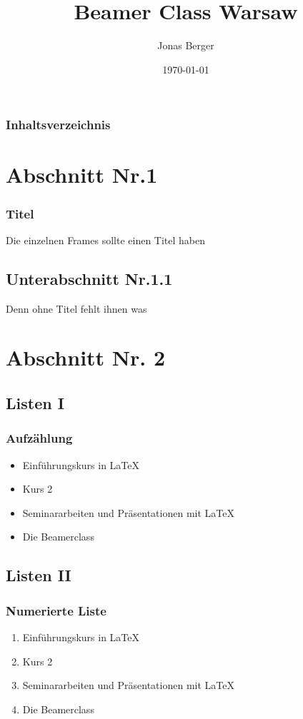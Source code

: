 \documentclass[compress,aspectratio=169]{beamer} %
\title{Beamer Class Warsaw}
\author{Jonas Berger}
\date{\today}
\begin{document}
	
\begin{frame}
	\titlepage
\end{frame}
	
\begin{frame}
	\frametitle{Inhaltsverzeichnis}
	\tableofcontents
\end{frame} 
	
	
\section{Abschnitt Nr.1} 
\begin{frame}
	\frametitle{Titel} 
	Die einzelnen Frames sollte einen Titel haben 
\end{frame}

	\subsection{Unterabschnitt Nr.1.1  }
	\begin{frame} 
		Denn ohne Titel fehlt ihnen was
	\end{frame}
	
\section{Abschnitt Nr. 2} 
	\subsection{Listen I}
	\begin{frame}
		\frametitle{Aufz\"ahlung}
		\begin{itemize}
			\item Einf\"uhrungskurs in \LaTeX  
			\item Kurs 2  
			\item Seminararbeiten und Pr\"asentationen mit \LaTeX 
			\item Die Beamerclass 
		\end{itemize} 
	\end{frame}
	
	\subsection{Listen II}
	\begin{frame}
		\frametitle{Numerierte Liste}
		\begin{enumerate}
			\item  Einf\"uhrungskurs in \LaTeX 
			\item  Kurs 2
			\item  Seminararbeiten und Pr\"asentationen mit \LaTeX 
			\item  Die Beamerclass
		\end{enumerate}
	\end{frame}
	
\end{document}
